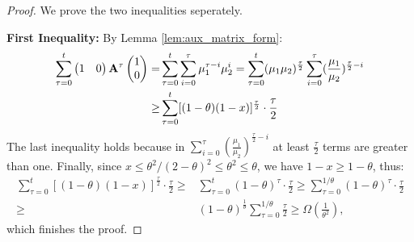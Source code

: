 \begin{proof}
We prove the two inequalities seperately.

\noindent \textbf{First Inequality:}
By Lemma \ref{lem:aux_matrix_form}:
\begin{align*}
\sum_{\tau = 0}^t \begin{pmatrix}  1 & 0  \end{pmatrix} \mathbf{A}^\tau \begin{pmatrix}  1 \\ 0  \end{pmatrix}
= &\sum_{\tau=0}^t \sum_{i=0}^\tau \mu_1^{\tau-i}\mu_2^{i} 
= \sum_{\tau=0}^t (\mu_1\mu_2)^{\frac{\tau}{2}}\sum_{i=0}^\tau (\frac{\mu_1}{\mu_2})^{\frac{\tau}{2} - i} \\
\ge& \sum_{\tau=0}^t [(1-\theta)(1-x)]^{\frac{\tau}{2}} \cdot \frac{\tau}{2}
\end{align*}
The last inequality holds because in $\sum_{i=0}^\tau (\frac{\mu_1}{\mu_2})^{\frac{\tau}{2}-i}$ at least $\frac{\tau}{2}$ terms are greater than one. 
Finally, since $x \le \theta^2/(2-\theta)^2 \le \theta^2\le \theta$, we have $1-x \ge 1-\theta$, thus:
\begin{align*}
\sum_{\tau=0}^t [(1-\theta)(1-x)]^{\frac{\tau}{2}} \cdot \frac{\tau}{2}
\ge & \sum_{\tau=0}^t (1-\theta)^{\tau} \cdot \frac{\tau}{2}
\ge \sum_{\tau=0}^{1/\theta} (1-\theta)^{\tau} \cdot \frac{\tau}{2}\\
\ge & (1-\theta)^{\frac{1}{\theta}}\sum_{\tau=0}^{1/\theta}  \frac{\tau}{2}
\ge \Omega(\frac{1}{\theta^2}),
\end{align*}
which finishes the proof.


\end{proof}
